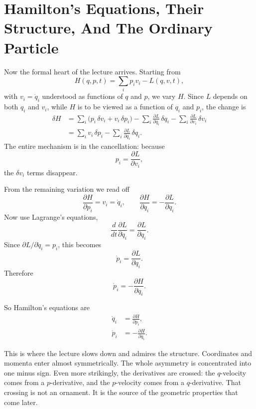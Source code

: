 \section{Hamilton's Equations, Their Structure, And The Ordinary Particle}

Now the formal heart of the lecture arrives. Starting from
\begin{equation}
H(q,p,t)=\sum_i p_i v_i-L(q,v,t),
\end{equation}
with \(v_i=\dot q_i\) understood as functions of \(q\) and \(p\), we vary \(H\). Since \(L\) depends on both \(q_i\) and \(v_i\), while \(H\) is to be viewed as a function of \(q_i\) and \(p_i\), the change is
\begin{align}
\delta H
&=
\sum_i \bigl(p_i\,\delta v_i + v_i\,\delta p_i\bigr)
-\sum_i \frac{\partial L}{\partial q_i}\,\delta q_i
-\sum_i \frac{\partial L}{\partial v_i}\,\delta v_i \\
&=
\sum_i v_i\,\delta p_i
-\sum_i \frac{\partial L}{\partial q_i}\,\delta q_i .
\end{align}
The entire mechanism is in the cancellation: because
\begin{equation}
p_i=\frac{\partial L}{\partial v_i},
\end{equation}
the \(\delta v_i\) terms disappear.

From the remaining variation we read off
\begin{equation}
\frac{\partial H}{\partial p_i}=v_i=\dot q_i,
\qquad
\frac{\partial H}{\partial q_i}=-\frac{\partial L}{\partial q_i}.
\end{equation}
Now use Lagrange's equations,
\begin{equation}
\frac{d}{dt}\frac{\partial L}{\partial \dot q_i}=\frac{\partial L}{\partial q_i}.
\end{equation}
Since \(\partial L/\partial \dot q_i=p_i\), this becomes
\begin{equation}
\dot p_i=\frac{\partial L}{\partial q_i}.
\end{equation}
Therefore
\begin{equation}
\dot p_i=-\frac{\partial H}{\partial q_i}.
\end{equation}

So Hamilton's equations are
\begin{align}
\dot q_i &= \frac{\partial H}{\partial p_i}, \\
\dot p_i &= -\frac{\partial H}{\partial q_i}.
\end{align}

This is where the lecture slows down and admires the structure. Coordinates and momenta enter almost symmetrically. The whole asymmetry is concentrated into one minus sign. Even more strikingly, the derivatives are crossed: the \(q\)-velocity comes from a \(p\)-derivative, and the \(p\)-velocity comes from a \(q\)-derivative. That crossing is not an ornament. It is the source of the geometric properties that come later.

